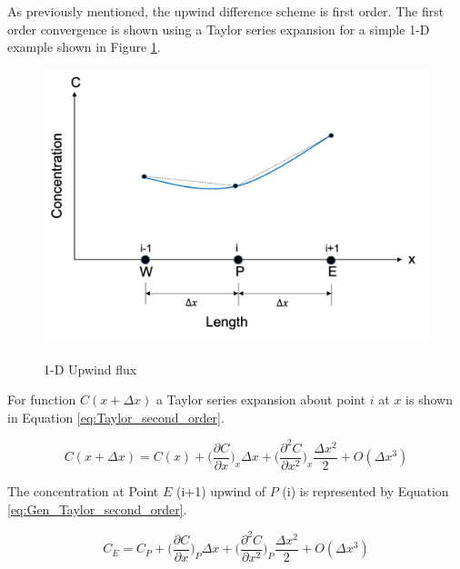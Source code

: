As previously mentioned, the upwind difference scheme is first order. The first order convergence is shown using a Taylor series expansion \cite{versteeg2007} for a simple 1-D example shown in Figure \ref{fig:1_D_upwind_flux}.

\begin{figure}[ht]
  \centering
  \includegraphics[width=5in]{images/1-DConvection.png}\\
  \caption{1-D Upwind flux}
  \label{fig:1_D_upwind_flux}
\end{figure}

For function $C(x + \Delta x)$ a Taylor series expansion about point $i$ at $x$ is shown in Equation \ref{eq:Taylor_second_order}.

\begin{equation}
    C(x+\Delta x) = C(x) + \bigg(\frac{\partial C}{\partial x}\bigg)_{x}\Delta x + \bigg(\frac{\partial^{2} C}{\partial x^{2}}\bigg)_{x}\frac{\Delta x^{2}}{2} + O(\Delta x^{3})
    \label{eq:Gen_Taylor_second_order}
\end{equation}

The concentration at Point $E$ (i+1) upwind of $P$ (i) is represented by Equation \ref{eq:Gen_Taylor_second_order}.

\begin{equation}
    C_{E} = C_{P} + \bigg(\frac{\partial C}{\partial x}\bigg)_{P}\Delta x + \bigg(\frac{\partial^{2} C}{\partial x^{2}}\bigg)_{P}\frac{\Delta x^{2}}{2} + O(\Delta x^{3})
    \label{eq:Taylor_second_order}
\end{equation}

